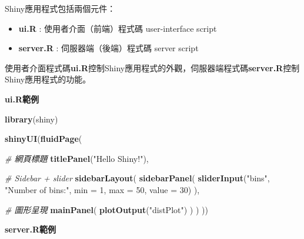 \documentclass[]{book}
\newenvironment{Shaded}{\begin{snugshade}}{\end{snugshade}}
\newcommand{\KeywordTok}[1]{\textcolor[rgb]{0.13,0.29,0.53}{\textbf{{#1}}}}
\newcommand{\DataTypeTok}[1]{\textcolor[rgb]{0.13,0.29,0.53}{{#1}}}
\newcommand{\DecValTok}[1]{\textcolor[rgb]{0.00,0.00,0.81}{{#1}}}
\newcommand{\StringTok}[1]{\textcolor[rgb]{0.31,0.60,0.02}{{#1}}}
\newcommand{\CommentTok}[1]{\textcolor[rgb]{0.56,0.35,0.01}{\textit{{#1}}}}
\newcommand{\NormalTok}[1]{{#1}}
\providecommand{\tightlist}{%
  \setlength{\itemsep}{0pt}\setlength{\parskip}{0pt}}
\theoremstyle{definition}
\theoremstyle{definition}
\theoremstyle{remark}
\begin{document}
Shiny應用程式包括兩個元件：

\begin{itemize}
\tightlist
\item
  \textbf{ui.R} : 使用者介面（前端）程式碼 user-interface script
\item
  \textbf{server.R} : 伺服器端（後端）程式碼 server script
\end{itemize}

使用者介面程式碼\textbf{ui.R}控制Shiny應用程式的外觀，伺服器端程式碼\textbf{server.R}控制Shiny應用程式的功能。

\textbf{ui.R範例}

\begin{Shaded}
\begin{Highlighting}[]
\KeywordTok{library}\NormalTok{(shiny)}

\KeywordTok{shinyUI}\NormalTok{(}\KeywordTok{fluidPage}\NormalTok{(}

  \CommentTok{# 網頁標題}
  \KeywordTok{titlePanel}\NormalTok{(}\StringTok{"Hello Shiny!"}\NormalTok{),}

  \CommentTok{# Sidebar + slider}
  \KeywordTok{sidebarLayout}\NormalTok{(}
    \KeywordTok{sidebarPanel}\NormalTok{(}
      \KeywordTok{sliderInput}\NormalTok{(}\StringTok{"bins"}\NormalTok{,}
                  \StringTok{"Number of bins:"}\NormalTok{,}
                  \DataTypeTok{min =} \DecValTok{1}\NormalTok{,}
                  \DataTypeTok{max =} \DecValTok{50}\NormalTok{,}
                  \DataTypeTok{value =} \DecValTok{30}\NormalTok{)}
    \NormalTok{),}

    \CommentTok{# 圖形呈現}
    \KeywordTok{mainPanel}\NormalTok{(}
      \KeywordTok{plotOutput}\NormalTok{(}\StringTok{"distPlot"}\NormalTok{)}
    \NormalTok{)}
  \NormalTok{)}
\NormalTok{))}
\end{Highlighting}
\end{Shaded}

\textbf{server.R範例}

\begin{Shaded}
\end{Shaded}
\end{document}
